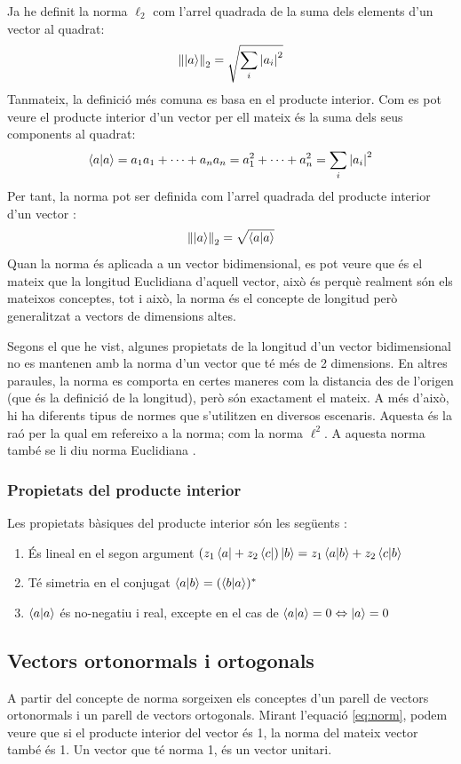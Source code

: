 Ja he definit la norma $\ell_2$ com l'arrel quadrada de la suma dels elements d'un vector al quadrat:
$$
\norm{\ket{a}}_2 = \sqrt{\sum_{i} \abs{a_{i}}^2}
$$
Tanmateix, la definició més comuna es basa en el producte interior. Com es pot veure el producte interior d'un vector per ell mateix és la suma dels seus components al quadrat:
$$
\bra{a}\ket{a} = a_1 a_1 + \cdots + a_n a_n = a_1^2 + \cdots +  a_n^2 \\= \sum_{i} \abs{a_i}^2
$$
Per tant, la norma pot ser definida com l'arrel quadrada del producte interior d'un vector \cite{LR_done_right:norm}:
\begin{equation}
\norm{\ket{a}}_2 = \sqrt{\bra{a}\ket{a}}
\label{eq:norm}
\end{equation}
Quan la norma és aplicada a un vector bidimensional, es pot veure que és el mateix que la longitud Euclidiana d'aquell vector, això és perquè realment són els mateixos conceptes, tot i això, la norma és el concepte de longitud però generalitzat a vectors de dimensions altes.

Segons el que he vist, algunes propietats de la longitud d'un vector bidimensional no es mantenen amb la norma d'un vector que té més de 2 dimensions. En altres paraules, la norma es comporta en certes maneres com la distancia des de l'origen (que és la definició de la longitud), però són exactament el mateix. A més d'això, hi ha diferents tipus de normes que s'utilitzen en diversos escenaris. Aquesta és la raó per la qual em refereixo a la norma; com la norma $\ell^2$. A aquesta norma també se li diu norma Euclidiana \cite{wolfram:2norm}.

\subsubsection{Propietats del producte interior}
Les propietats bàsiques del producte interior són les següents \cite{QCandQI:intro}:
\begin{enumerate}
	\item És lineal en el segon argument $ (z_1\bra{a}+ z_2\bra{c})\ket{b} = z_1\bra{a}\ket{b} + z_2\bra{c}\ket{b}$
	\item Té simetria en el conjugat $\bra{a}\ket{b} = (\bra{b}\ket{a})^*$
	\item $\bra{a}\ket{a}$ és no-negatiu i real, excepte en el cas de $\bra{a}\ket{a} = 0 \Leftrightarrow \ket{a} = 0$
\end{enumerate}

 
\subsection{Vectors ortonormals i ortogonals}
A partir del concepte de norma sorgeixen els conceptes d'un parell de vectors ortonormals i un parell de vectors ortogonals.
Mirant l'equació \eqref{eq:norm}, podem veure que si el producte interior del vector és 1, la norma del mateix vector també és 1. Un vector que té norma 1, és un vector unitari.

